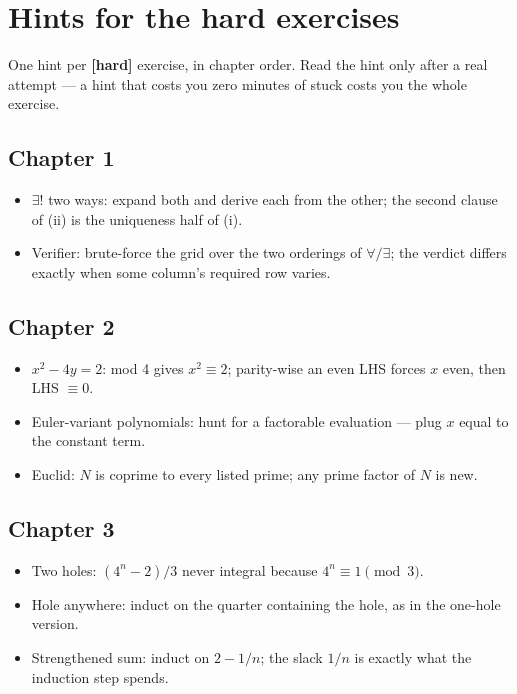 \chapter{Hints for the hard exercises}

One hint per \textbf{[hard]} exercise, in chapter order. Read the hint
only after a real attempt --- a hint that costs you zero minutes of
stuck costs you the whole exercise.

\section*{Chapter 1}
\begin{itemize}
\item $\exists!$ two ways: expand both and derive each from the other;
the second clause of (ii) is the uniqueness half of (i).
\item Verifier: brute-force the grid over the two orderings of
$\forall/\exists$; the verdict differs exactly when some column's
required row varies.
\end{itemize}

\section*{Chapter 2}
\begin{itemize}
\item $x^2-4y=2$: mod 4 gives $x^2\equiv2$; parity-wise an even LHS
forces $x$ even, then LHS $\equiv0$.
\item Euler-variant polynomials: hunt for a factorable evaluation ---
plug $x$ equal to the constant term.
\item Euclid: $N$ is coprime to every listed prime; any prime factor of
$N$ is new.
\end{itemize}

\section*{Chapter 3}
\begin{itemize}
\item Two holes: $(4^n-2)/3$ never integral because $4^n\equiv1\pmod3$.
\item Hole anywhere: induct on the quarter containing the hole, as in
the one-hole version.
\item Strengthened sum: induct on $2-1/n$; the slack $1/n$ is exactly
what the induction step spends.
\end{itemize}

